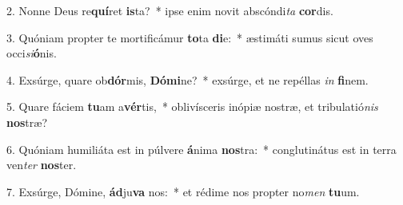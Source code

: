 2. Nonne Deus re\textbf{quí}ret \textbf{is}ta?~*  ipse enim novit abscóndi\textit{ta} \textbf{cor}dis.\

3. Quóniam propter te mortificámur \textbf{to}ta \textbf{di}e:~*  æstimáti sumus sicut oves occi\textit{si}\textbf{ó}nis.\

4. Exsúrge, quare ob\textbf{dór}mis, \textbf{Dó}\textbf{mi}ne?~*  exsúrge, et ne repéllas \textit{in} \textbf{fi}nem.\

5. Quare fáciem \textbf{tu}am a\textbf{vér}tis,~*  oblivísceris inópiæ nostræ, et tribulatió\textit{nis} \textbf{nos}træ?\

6. Quóniam humiliáta est in púlvere \textbf{á}nima \textbf{nos}tra:~*  conglutinátus est in terra ven\textit{ter} \textbf{nos}ter.\

7. Exsúrge, Dómine, \textbf{ád}ju\textbf{va} nos:~*  et rédime nos propter no\textit{men} \textbf{tu}um.\

